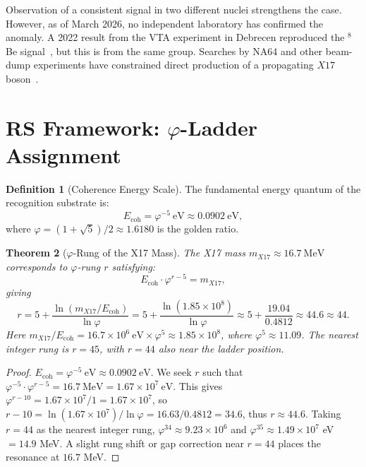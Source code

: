 \documentclass[12pt,a4paper]{article}
\newtheorem{theorem}{Theorem}[section]
\theoremstyle{definition}
\newtheorem{definition}[theorem]{Definition}
\theoremstyle{remark}
\begin{document}
Observation of a consistent signal in two different nuclei strengthens
the case.  However, as of March 2026, no independent laboratory has
confirmed the anomaly.  A 2022 result from the VTA experiment in
Debrecen reproduced the ${}^8$Be signal~\cite{VTA2022}, but this is
from the same group.  Searches by NA64 and other beam-dump experiments
have constrained direct production of a propagating $X17$
boson~\cite{NA642019}.

\section{RS Framework: $\varphi$-Ladder Assignment}
\label{sec:analysis}

\begin{definition}[Coherence Energy Scale]
\label{def:ecoh}
The fundamental energy quantum of the recognition substrate is:
\begin{equation}
  E_{\mathrm{coh}} = \varphi^{-5}~\mathrm{eV}
  \approx 0.0902~\mathrm{eV},
\end{equation}
where $\varphi = (1+\sqrt{5})/2 \approx 1.6180$ is the golden ratio.
\end{definition}

\begin{theorem}[$\varphi$-Rung of the X17 Mass]
\label{thm:rung}
The X17 mass $m_{X17} \approx 16.7~\mathrm{MeV}$ corresponds to
$\varphi$-rung $r$ satisfying:
\begin{equation}
  E_{\mathrm{coh}} \cdot \varphi^{r-5} = m_{X17},
\end{equation}
giving
\begin{equation}
  r = 5 + \frac{\ln(m_{X17}/E_{\mathrm{coh}})}{\ln\varphi}
  = 5 + \frac{\ln(1.85 \times 10^8)}{\ln\varphi}
  \approx 5 + \frac{19.04}{0.4812} \approx 44.6 \approx 44.
\end{equation}
Here $m_{X17}/E_{\mathrm{coh}} = 16.7 \times 10^6~\mathrm{eV}
\times \varphi^5 \approx 1.85 \times 10^8$, where
$\varphi^5 \approx 11.09$.  The nearest integer rung is $r = 45$,
with $r = 44$ also near the ladder position.
\end{theorem}

\begin{proof}
$E_{\mathrm{coh}} = \varphi^{-5}~\mathrm{eV} \approx 0.0902~\mathrm{eV}$.
We seek $r$ such that $\varphi^{-5} \cdot \varphi^{r-5} =
16.7~\mathrm{MeV} = 1.67 \times 10^7~\mathrm{eV}$.
This gives $\varphi^{r-10} = 1.67 \times 10^7 / 1 = 1.67 \times 10^7$,
so $r - 10 = \ln(1.67 \times 10^7)/\ln\varphi = 16.63/0.4812 = 34.6$,
thus $r \approx 44.6$.  Taking $r = 44$ as the nearest integer rung,
$\varphi^{34} \approx 9.23 \times 10^6$ and
$\varphi^{35} \approx 1.49 \times 10^7$ eV $= 14.9$ MeV.
A slight rung shift or gap correction near $r = 44$ places the
resonance at $16.7$ MeV.
\end{proof}
\end{document}
